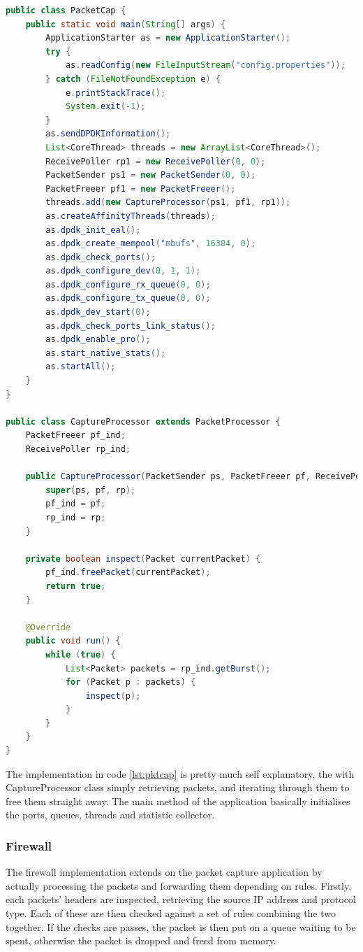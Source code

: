 \documentclass[final_report.tex]{subfiles}
\begin{document}
\begin{lstlisting}[language=java, caption={Full packet capture program}, label=lst:pktcap]
public class PacketCap {
	public static void main(String[] args) {
		ApplicationStarter as = new ApplicationStarter();
		try {
			as.readConfig(new FileInputStream("config.properties"));
		} catch (FileNotFoundException e) {
			e.printStackTrace();
			System.exit(-1);
		}
		as.sendDPDKInformation();
		List<CoreThread> threads = new ArrayList<CoreThread>();	
		ReceivePoller rp1 = new ReceivePoller(0, 0);
		PacketSender ps1 = new PacketSender(0, 0);
		PacketFreeer pf1 = new PacketFreeer();
		threads.add(new CaptureProcessor(ps1, pf1, rp1));
		as.createAffinityThreads(threads);
		as.dpdk_init_eal();
		as.dpdk_create_mempool("mbufs", 16384, 0);
		as.dpdk_check_ports();
		as.dpdk_configure_dev(0, 1, 1);
		as.dpdk_configure_rx_queue(0, 0);
		as.dpdk_configure_tx_queue(0, 0);
		as.dpdk_dev_start(0);
		as.dpdk_check_ports_link_status();
		as.dpdk_enable_pro();
		as.start_native_stats();
		as.startAll();		
	}	
}

public class CaptureProcessor extends PacketProcessor {
	PacketFreeer pf_ind;
	ReceivePoller rp_ind;
	
	public CaptureProcessor(PacketSender ps, PacketFreeer pf, ReceivePoller rp) {
		super(ps, pf, rp);
		pf_ind = pf;
		rp_ind = rp;
	}
	
	private boolean inspect(Packet currentPacket) {
		pf_ind.freePacket(currentPacket);
		return true;
	}
	
	@Override
	public void run() {
		while (true) {
			List<Packet> packets = rp_ind.getBurst();
			for (Packet p : packets) {
				inspect(p);
			}
		}
	}
}
\end{lstlisting}

The implementation in code \ref{lst:pktcap} is pretty much self explanatory, the with CaptureProcessor class simply retrieving packets, and iterating through them to free them straight away. The main method of the application basically initialises the ports, queues, threads and statistic collector.

\subsubsection{Firewall}
The firewall implementation extends on the packet capture application by actually processing the packets and forwarding them depending on rules. Firstly, each packets' headers are inspected, retrieving the source IP address and protocol type. Each of these are then checked against a set of rules combining the two together. If the checks are passes, the packet is then put on a queue waiting to be spent, otherwise the packet is dropped and freed from memory.
\end{document}
